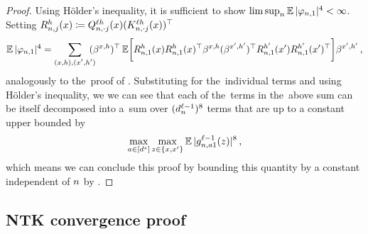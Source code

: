\begin{proof}
    Using H{\" o}lder's inequality, it is sufficient to show $\limsup_{n} \operatorname*{\mathbb{E}} | \varphi_{n, 1} |^4 < \infty$.
    Setting $R_{n, j}^{h}(x) \coloneqq Q_{n, \cdot j}^{\ell h}(x) (K_{n, \cdot j}^{\ell h}(x))^\top$
    \begin{align*}
        \operatorname*{\mathbb{E}} | \varphi_{n, 1} |^4
        =
        \sum_{\substack{(x, h) , (x', h')}}
        \!\!\!\!
            (\beta^{x, h})^\top
            \operatorname*{\mathbb{E}} \biggl[
                R_{n, 1}^{h}(x)
                R_{n, 1}^{h}(x)^\top
                \beta^{x, h}
                (\beta^{x', h'})^\top
                R_{n, 1}^{h'}(x')
                R_{n, 1}^{h'}(x')^\top
            \biggr]
            \beta^{x', h'}
        \, ,
    \end{align*}
    analogously to the~proof of .
    Substituting for the~individual terms and using H{\" o}lder's inequality, we we can see that each of the~terms in the~above sum can be itself decomposed into a~sum over $(d_{n}^{\ell - 1})^8$ terms that are up to a constant upper bounded by 
    \begin{equation*}
        \max_{a \in [d^s]} \max_{z \in \{ x, x' \} } 
        \operatorname*{\mathbb{E}} | {g}^{\ell - 1}_{n, a 1}{(z)} |^8 
        \, ,
    \end{equation*}
    which means we can conclude this proof by bounding this quantity by a constant independent of $n$ by .
\end{proof}





\subsection{NTK convergence proof}\label{sect:ntk_proofs}



